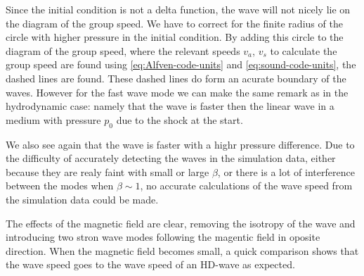Since the initial condition is not a delta function, the wave will not nicely lie on the diagram of the group speed.
We have to correct for the finite radius of the circle with higher pressure in the initial condition.
By adding this circle to the diagram of the group speed, where the relevant speeds $v_a$, $v_s$ to calculate the group speed are found using \autoref{eq:Alfven-code-units} and \autoref{eq:sound-code-units}, the dashed lines are found.
These dashed lines do form an acurate boundary of the waves.
However for the fast wave mode we can make the same remark as in the hydrodynamic case: namely that the wave is faster then the linear wave in a medium with pressure $p_0$ due to the shock at the start.

We also see again that the wave is faster with a highr pressure difference. 
Due to the difficulty of accurately detecting the waves in the simulation data, either because they are realy faint with small or large $\beta$, or there is a lot of interference between the modes when $\beta \sim 1$, no accurate calculations of the wave speed from the simulation data could be made.

The effects of the magnetic field are clear, removing the isotropy of the wave and introducing two stron wave modes following the magentic field in oposite direction.
When the magnetic field becomes small, a quick comparison shows that the wave speed goes to the wave speed of an HD-wave as expected.

